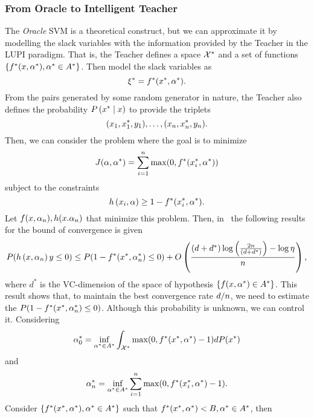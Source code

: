 \subsubsection*{From Oracle to Intelligent Teacher}
The \emph{Oracle} SVM is a theoretical construct, but we can approximate it by modelling the slack variables with the information provided by the Teacher in the LUPI paradigm.
That is, the Teacher defines a space $\mathcal{X}^*$ and a set of functions $\left\{f^*(x, \alpha^*) , \alpha^* \in A^*\right\}$. Then model the slack variables as
\begin{equation}
    \nonumber
    \xi^* = f^*(x^*, \alpha^*) .
\end{equation}
From the pairs generated by some random generator in nature, the Teacher also defines the probability $P\left( x^* \;\middle\vert\; x \right)$ to provide the triplets
\begin{equation}
    \nonumber
    (x_1, x^*_1, y_1), \ldots, (x_n, x^*_n, y_n) .
\end{equation}
Then, we can consider the problem where the goal is to minimize
$$ J(\alpha, \alpha^*) = \sum_{i=1}^n \max(0, f^*(x_i^*, \alpha^*)) $$
subject to the constraints
$$ h\left(x_i, \alpha\right) \geq 1 - f^*(x_i^*, \alpha^*).$$
Let $f(x, \alpha_n), h(x. \alpha_n)$ that minimize this problem. Then, in~\cite[Proposition~2]{VapnikV09} the following results for the bound of convergence is given
\begin{equation}
    \nonumber
    P(h\left(x, \alpha_n\right) y \leq 0) \leq P(1 - f^*(x^*, \alpha^*_n) \leq 0) + O\left( \frac{(d + d^*) \log\left(\frac{2n}{(d + d^*)} \right) - \log\eta}{n}  \right) ,
\end{equation}
where $d^*$ is the VC-dimension of the space of hypothesis $\left\{f(x, \alpha^*) \in A^*\right\}$. This result shows that, to maintain the best convergence rate $d/n$, we need to estimate the $P(1 - f^*(x^*, \alpha^*_n) \leq 0)$. Although this probability is unknown,  we can control it. Considering
\begin{equation}
    \nonumber
    \alpha^*_0 = \inf_{\alpha^* \in A^*} \int_{\mathcal{X}^*} \max(0, f^*(x^*, \alpha^*)- 1) dP(x^*)
\end{equation}
and
\begin{equation}
    \nonumber
    \alpha^*_n = \inf_{\alpha^* \in A^*} \sum_{i=1}^n \max(0, f^*(x^*_i, \alpha^*)- 1) .
\end{equation}
Consider $\left\{f^*(x^*, \alpha^*), \alpha^* \in A^*\right\}$ such that $f^*(x^*, \alpha^*) < B, \alpha^* \in A^*$, then 
